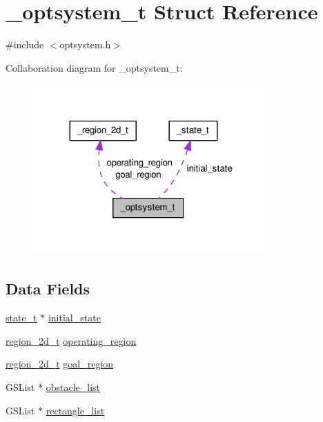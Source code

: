 \hypertarget{a00004}{\section{\-\_\-optsystem\-\_\-t \-Struct \-Reference}
\label{d0/d0b/a00004}
}


{\ttfamily \#include $<$optsystem.\-h$>$}



\-Collaboration diagram for \-\_\-optsystem\-\_\-t\-:
\nopagebreak
\begin{figure}[H]
\begin{center}
\leavevmode
\includegraphics[width=257pt]{de/d8c/a00036}
\end{center}
\end{figure}
\subsection*{\-Data \-Fields}
\begin{DoxyCompactItemize}
\item 
\hyperlink{a00018_a1c9d0bb39483d4981491e6383b0dbb47_a1c9d0bb39483d4981491e6383b0dbb47}{state\-\_\-t} $\ast$ \hyperlink{a00004_ad793fe48f6f4a6d697dc4629f9cb6e91_ad793fe48f6f4a6d697dc4629f9cb6e91}{initial\-\_\-state}
\item 
\hyperlink{a00018_a9136102e25aac8406a94d89f5a95bd1f_a9136102e25aac8406a94d89f5a95bd1f}{region\-\_\-2d\-\_\-t} \hyperlink{a00004_ade92b4bd2437c5d7a474613d0c0c8e95_ade92b4bd2437c5d7a474613d0c0c8e95}{operating\-\_\-region}
\item 
\hyperlink{a00018_a9136102e25aac8406a94d89f5a95bd1f_a9136102e25aac8406a94d89f5a95bd1f}{region\-\_\-2d\-\_\-t} \hyperlink{a00004_a78dce10731005cd5cac846e2eea1a76d_a78dce10731005cd5cac846e2eea1a76d}{goal\-\_\-region}
\item 
\-G\-S\-List $\ast$ \hyperlink{a00004_a5fa7d8df84a6fea47d81dec9cb2c68f2_a5fa7d8df84a6fea47d81dec9cb2c68f2}{obstacle\-\_\-list}
\item 
\-G\-S\-List $\ast$ \hyperlink{a00004_a74c86a6f406deb440600ab0679898043_a74c86a6f406deb440600ab0679898043}{rectangle\-\_\-list}
\end{DoxyCompactItemize}


